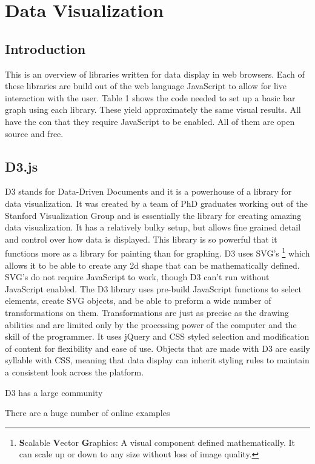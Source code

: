 \documentclass[draftclsnofoot,onecolumn,letterpaper,10pt,compsoc]{IEEEtran}
\begin{document}
\section{Data Visualization}
  \subsection{Introduction}
  This is an overview of libraries written for data display in web browsers.
  Each of these libraries are build out of the web language JavaScript to allow for live interaction with the user.
  Table 1 shows the code needed to set up a basic bar graph using each library.
  These yield approximately the same visual results.
  All have the con that they require JavaScript to be enabled.
  All of them are open source and free.

  \subsection{D3.js}
  D3 stands for Data-Driven Documents and it is a powerhouse of a library for data visualization.
  It was created by a team of PhD graduates working out of the Stanford Visualization Group and is essentially the library for creating amazing data visualization.
  It has a relatively bulky setup, but allows fine grained detail and control over how data is displayed.
  This library is so powerful that it functions more as a library for painting than for graphing.
  D3 uses SVG's \footnote{\textbf{S}calable \textbf{V}ector \textbf{G}raphics: A visual component defined mathematically. It can scale up or down to any size without loss of image quality.} which allows it to be able to create any 2d shape that can be mathematically defined.
  SVG's do not require JavaScript to work, though D3 can't run without JavaScript enabled.
  The D3 library uses pre-build JavaScript functions to select elements, create SVG objects, and be able to preform a wide number of transformations on them.
  Transformations are just as precise as the drawing abilities and are limited only by the processing power of the computer and the skill of the programmer.
  It uses jQuery and CSS styled selection and modification of content for flexibility and ease of use.
  Objects that are made with D3 are easily syllable with CSS, meaning that data display can inherit styling rules to maintain a consistent look across the platform.

  D3 has a large community

  There are a huge number of online examples
\end{document}
